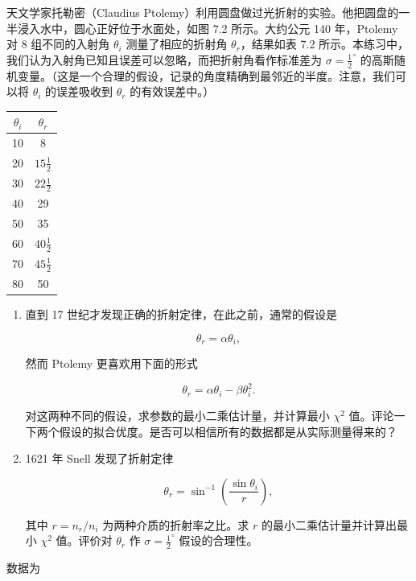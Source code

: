 \begin{question}
天文学家托勒密（Claudius
Ptolemy）利用圆盘做过光折射的实验。他把圆盘的一半浸入水中，圆心正好位于水面处，如图
7.2 所示。大约公元 140 年，Ptolemy 对 8 组不同的入射角 \(\theta_i\)
测量了相应的折射角 \(\theta_r\)，结果如表 7.2
所示。本练习中，我们认为入射角已知且误差可以忽略，而把折射角看作标准差为
\(\sigma=\frac12^\circ\)
的高斯随机变量。（这是一个合理的假设，记录的角度精确到最邻近的半度。注意，我们可以将
\(\theta_i\) 的误差吸收到 \(\theta_r\) 的有效误差中。）


\begin{center}
\begin{tabular}{cc}
\toprule
\(\theta_i\) & \(\theta_r\) \\
\midrule
10 & 8 \\
20 & \(15\frac12\) \\
30 & \(22\frac12\) \\
40 & 29 \\
50 & 35 \\
60 & \(40\frac12\) \\
70 & \(45\frac12\) \\
80 & 50 \\
\bottomrule
\end{tabular}
\par\vspace{0.25em}{\small 表 7.2: Ptolemy 折射实验的入射角和折射角，单位均为度。\par}
\end{center}

\begin{enumerate}
\item 直到 17 世纪才发现正确的折射定律，在此之前，通常的假设是

\[
\theta_r=\alpha\theta_i,
\]

然而 Ptolemy 更喜欢用下面的形式

\[
\theta_r=\alpha\theta_i-\beta\theta_i^2.
\]

对这两种不同的假设，求参数的最小二乘估计量，并计算最小 \(\chi^2\)
值。评论一下两个假设的拟合优度。是否可以相信所有的数据都是从实际测量得来的？

\item 1621 年 Snell 发现了折射定律

\[
\theta_r=\sin^{-1}\left(\frac{\sin\theta_i}{r}\right),
\]

其中 \(r=n_r/n_i\) 为两种介质的折射率之比。求 \(r\)
的最小二乘估计量并计算出最小 \(\chi^2\) 值。评价对 \(\theta_r\) 作
\(\sigma=\frac12^\circ\) 假设的合理性。
\end{enumerate}
\begin{solution}
数据为


\end{solution}
\end{question}
